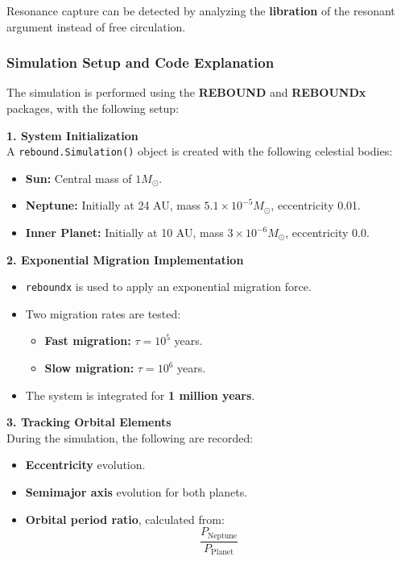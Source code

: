 \documentclass[12pt,a4paper]{article}
\begin{document}
Resonance capture can be detected by analyzing the \textbf{libration} of the resonant argument instead of free circulation.

\subsubsection{Simulation Setup and Code Explanation}

The simulation is performed using the \textbf{REBOUND} and \textbf{REBOUNDx} packages, with the following setup:

\textbf{1. System Initialization}
\\ A \texttt{rebound.Simulation()} object is created with the following celestial bodies:
\begin{itemize}
    \item \textbf{Sun:} Central mass of \( 1 M_{\odot} \).
    \item \textbf{Neptune:} Initially at 24 AU, mass \( 5.1 \times 10^{-5} M_{\odot} \), eccentricity 0.01.
    \item \textbf{Inner Planet:} Initially at 10 AU, mass \( 3 \times 10^{-6} M_{\odot} \), eccentricity 0.0.
\end{itemize}

\textbf{2. Exponential Migration Implementation}
\begin{itemize}
    \item \texttt{reboundx} is used to apply an exponential migration force.
    \item Two migration rates are tested:
    \begin{itemize}
        \item \textbf{Fast migration:} \( \tau = 10^5 \) years.
        \item \textbf{Slow migration:} \( \tau = 10^6 \) years.
    \end{itemize}
    \item The system is integrated for \textbf{1 million years}.
\end{itemize}

\textbf{3. Tracking Orbital Elements}
\\ During the simulation, the following are recorded:
\begin{itemize}
    \item \textbf{Eccentricity} evolution.
    \item \textbf{Semimajor axis} evolution for both planets.
    \item \textbf{Orbital period ratio}, calculated from:
    \begin{equation}
        \frac{P_{\text{Neptune}}}{P_{\text{Planet}}}
    \end{equation}
\end{itemize}
\end{document}
